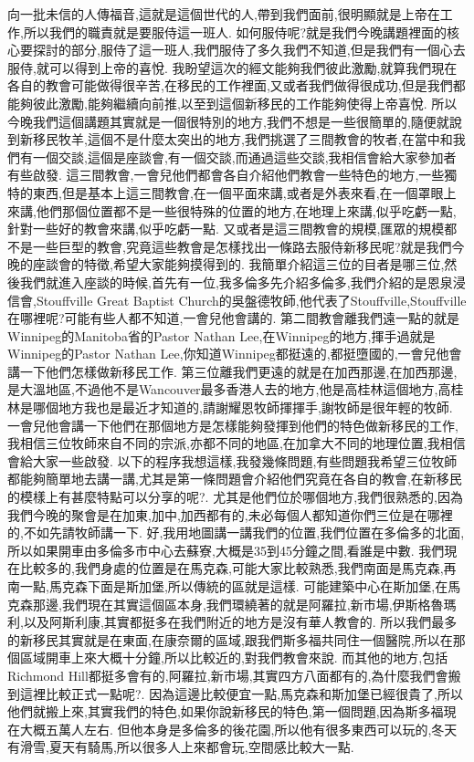\documentclass{book}
\begin{document}
向一批未信的人傳福音,這就是這個世代的人,帶到我們面前,很明顯就是上帝在工作,所以我們的職責就是要服侍這一班人.
如何服侍呢?就是我們今晚講題裡面的核心要探討的部分,服侍了這一班人,我們服侍了多久我們不知道,但是我們有一個心去服侍,就可以得到上帝的喜悅.
我盼望這次的經文能夠我們彼此激勵,就算我們現在各自的教會可能做得很辛苦,在移民的工作裡面,又或者我們做得很成功,但是我們都能夠彼此激勵,能夠繼續向前推,以至到這個新移民的工作能夠使得上帝喜悅.
所以今晚我們這個講題其實就是一個很特別的地方,我們不想是一些很簡單的,隨便就說到新移民牧羊,這個不是什麼太突出的地方,我們挑選了三間教會的牧者,在當中和我們有一個交談,這個是座談會,有一個交談,而通過這些交談,我相信會給大家參加者有些啟發.
這三間教會,一會兒他們都會各自介紹他們教會一些特色的地方,一些獨特的東西,但是基本上這三間教會,在一個平面來講,或者是外表來看,在一個罩眼上來講,他們那個位置都不是一些很特殊的位置的地方,在地理上來講,似乎吃虧一點,針對一些好的教會來講,似乎吃虧一點.
又或者是這三間教會的規模,匯眾的規模都不是一些巨型的教會,究竟這些教會是怎樣找出一條路去服侍新移民呢?就是我們今晚的座談會的特徵,希望大家能夠摸得到的.
我簡單介紹這三位的目者是哪三位,然後我們就進入座談的時候,首先有一位,我多倫多先介紹多倫多,我們介紹的是恩泉浸信會,Stouffville Great Baptist Church的吳盤德牧師,他代表了Stouffville,Stouffville在哪裡呢?可能有些人都不知道,一會兒他會講的.
第二間教會離我們遠一點的就是Winnipeg的Manitoba省的Pastor Nathan Lee,在Winnipeg的地方,揮手過就是Winnipeg的Pastor Nathan Lee,你知道Winnipeg都挺遠的,都挺墮國的,一會兒他會講一下他們怎樣做新移民工作.
第三位離我們更遠的就是在加西那邊,在加西那邊,是大溫地區,不過他不是Wancouver最多香港人去的地方,他是高桂林這個地方,高桂林是哪個地方我也是最近才知道的,請謝耀恩牧師揮揮手,謝牧師是很年輕的牧師.
一會兒他會講一下他們在那個地方是怎樣能夠發揮到他們的特色做新移民的工作,我相信三位牧師來自不同的宗派,亦都不同的地區,在加拿大不同的地理位置,我相信會給大家一些啟發.
以下的程序我想這樣,我發幾條問題,有些問題我希望三位牧師都能夠簡單地去講一講,尤其是第一條問題會介紹他們究竟在各自的教會,在新移民的模樣上有甚麼特點可以分享的呢?.
尤其是他們位於哪個地方,我們很熟悉的,因為我們今晚的聚會是在加東,加中,加西都有的,未必每個人都知道你們三位是在哪裡的,不如先請牧師講一下.
好,我用地圖講一講我們的位置,我們位置在多倫多的北面,所以如果開車由多倫多市中心去蘇寮,大概是35到45分鐘之間,看誰是中數.
我們現在比較多的,我們身處的位置是在馬克森,可能大家比較熟悉,我們南面是馬克森,再南一點,馬克森下面是斯加堡,所以傳統的區就是這樣.
可能建築中心在斯加堡,在馬克森那邊,我們現在其實這個區本身,我們環繞著的就是阿羅拉,新市場,伊斯格魯瑪利,以及阿斯利康,其實都挺多在我們附近的地方是沒有華人教會的.
所以我們最多的新移民其實就是在東面,在康奈爾的區域,跟我們斯多福共同住一個醫院,所以在那個區域開車上來大概十分鐘,所以比較近的,對我們教會來說.
而其他的地方,包括Richmond Hill都挺多會有的,阿羅拉,新市場,其實四方八面都有的,為什麼我們會搬到這裡比較正式一點呢?.
因為這邊比較便宜一點,馬克森和斯加堡已經很貴了,所以他們就搬上來,其實我們的特色,如果你說新移民的特色,第一個問題,因為斯多福現在大概五萬人左右.
但他本身是多倫多的後花園,所以他有很多東西可以玩的,冬天有滑雪,夏天有騎馬,所以很多人上來都會玩,空間感比較大一點.
\end{document}
